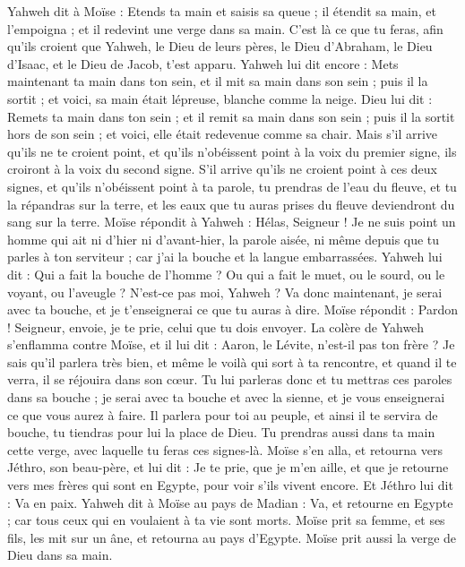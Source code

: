 \begin{multicols}{2}
Yahweh dit à Moïse : Etends ta main et saisis sa queue ; il étendit sa main, et l'empoigna ; et il redevint une verge dans sa main.
C’est là ce que tu feras, afin qu'ils croient que Yahweh, le Dieu de leurs pères, le Dieu d'Abraham, le Dieu d'Isaac, et le Dieu de Jacob, t'est apparu.
Yahweh lui dit encore : Mets maintenant ta main dans ton sein, et il mit sa main dans son sein ; puis il la sortit ; et voici, sa main était lépreuse, blanche comme la neige.
Dieu lui dit : Remets ta main dans ton sein ; et il remit sa main dans son sein ; puis il la sortit hors de son sein ; et voici, elle était redevenue comme sa chair.
Mais s'il arrive qu'ils ne te croient point, et qu'ils n'obéissent point à la voix du premier signe, ils croiront à la voix du second signe.
S'il arrive qu'ils ne croient point à ces deux signes, et qu'ils n'obéissent point à ta parole, tu prendras de l'eau du fleuve, et tu la répandras sur la terre, et les eaux que tu auras prises du fleuve deviendront du sang sur la terre.
Moïse répondit à Yahweh : Hélas, Seigneur ! Je ne suis point un homme qui ait ni d'hier ni d’avant-hier, la parole aisée, ni même depuis que tu parles à ton serviteur ; car j'ai la bouche et la langue embarrassées.
Yahweh lui dit : Qui a fait la bouche de l'homme ? Ou qui a fait le muet, ou le sourd, ou le voyant, ou l'aveugle ? N’est-ce pas moi, Yahweh\FTNT{} ?
Va donc maintenant, je serai avec ta bouche, et je t'enseignerai ce que tu auras à dire\FTNT{}.
Moïse répondit : Pardon ! Seigneur, envoie, je te prie, celui que tu dois envoyer.
La colère de Yahweh s’enflamma contre Moïse, et il lui dit : Aaron, le Lévite, n'est-il pas ton frère ? Je sais qu'il parlera très bien, et même le voilà qui sort à ta rencontre, et quand il te verra, il se réjouira dans son cœur.
Tu lui parleras donc et tu mettras ces paroles dans sa bouche ; je serai avec ta bouche et avec la sienne, et je vous enseignerai ce que vous aurez à faire.
Il parlera pour toi au peuple, et ainsi il te servira de bouche, tu tiendras pour lui la place de Dieu.
Tu prendras aussi dans ta main cette verge, avec laquelle tu feras ces signes-là.
Moïse s'en alla, et retourna vers Jéthro, son beau-père, et lui dit : Je te prie, que je m'en aille, et que je retourne vers mes frères qui sont en Egypte, pour voir s'ils vivent encore. Et Jéthro lui dit : Va en paix.
Yahweh dit à Moïse au pays de Madian : Va, et retourne en Egypte ; car tous ceux qui en voulaient à ta vie sont morts.
Moïse prit sa femme, et ses fils, les mit sur un âne, et retourna au pays d'Egypte. Moïse prit aussi la verge de Dieu dans sa main.

\end{multicols}
